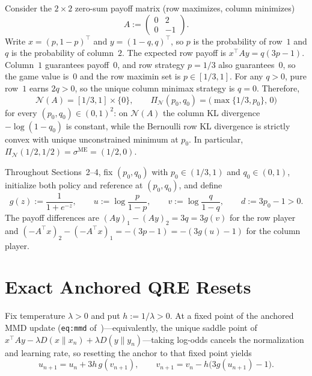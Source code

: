 \documentclass[11pt]{article}
\theoremstyle{plain}
\theoremstyle{definition}
\theoremstyle{remark}
\newcommand{\NE}{\mathcal{N}}
\begin{document}
Consider the $2\times 2$ zero-sum payoff matrix (row maximizes, column minimizes)
\[
A := \begin{pmatrix} 0 & 2 \\ 0 & -1 \end{pmatrix}.
\]
Write $x = (p, 1 - p)^\top$ and $y = (1 - q, q)^\top$, so $p$ is the probability of row~$1$ and $q$ is the probability of column~$2$. The expected row payoff is $x^\top A y = q(3p - 1)$.
Column~$1$ guarantees payoff~$0$, and row strategy $p = 1/3$ also guarantees~$0$, so the game value is~$0$ and the row maximin set is $p \in [1/3, 1]$. For any $q > 0$, pure row~$1$ earns $2q > 0$, so the unique column minimax strategy is $q = 0$. Therefore,
\[
\NE(A) = [1/3, 1] \times \{0\}, \qquad
\Pi_{\NE}(p_0, q_0) = \bigl(\max\{1/3, p_0\},\, 0\bigr)
\]
for every $(p_0, q_0) \in (0, 1)^2$: on $\NE(A)$ the column KL divergence $-\log(1 - q_0)$ is constant, while the Bernoulli row KL divergence is strictly convex with unique unconstrained minimum at $p_0$. In particular, $\Pi_{\NE}(1/2, 1/2) = \sigma^{\mathrm{ME}} = (1/2, 0)$.

Throughout Sections~2--4, fix $(p_0, q_0)$ with $p_0 \in (1/3, 1)$ and $q_0 \in (0, 1)$, initialize both policy and reference at $(p_0, q_0)$, and define
\[
g(z) := \frac{1}{1 + e^{-z}}, \qquad
u := \log\frac{p}{1 - p}, \qquad
v := \log\frac{q}{1 - q}, \qquad
d := 3p_0 - 1 > 0.
\]
The payoff differences are $(Ay)_1 - (Ay)_2 = 3q = 3g(v)$ for the row player and $(-A^\top x)_2 - (-A^\top x)_1 = -(3p - 1) = -(3g(u) - 1)$ for the column player.

\section{Exact Anchored QRE Resets}

Fix temperature $\lambda > 0$ and put $h := 1/\lambda > 0$. At a fixed point of the anchored MMD update (\texttt{eq:mmd} of~\cite{Leal2026})---equivalently, the unique saddle point of $x^\top A y - \lambda D(x \| x_n) + \lambda D(y \| y_n)$---taking log-odds cancels the normalization and learning rate, so resetting the anchor to that fixed point yields
\begin{equation}\label{eq:qre-reset}
u_{n+1} = u_n + 3h\,g(v_{n+1}), \qquad
v_{n+1} = v_n - h\bigl(3g(u_{n+1}) - 1\bigr).
\end{equation}
\end{document}
